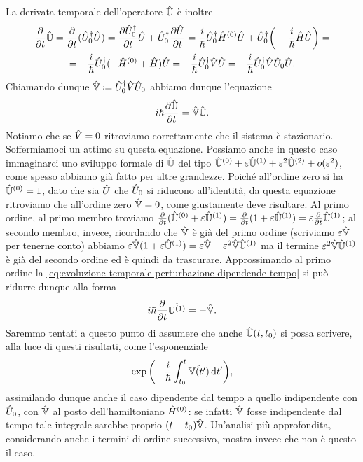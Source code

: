La derivata temporale dell'operatore $\hat{\mathbb U}$ è inoltre
\begin{multline}
	\frac{\partial {}}{\partial {t}}\hat{\mathbb U}=\frac{\partial {}}{\partial {t}}({\hat{U}_0}^\dagger\hat{U})=\frac{\partial {{\hat{U}_0}^\dagger}}{\partial {t}}\hat{U}+{\hat{U}_0}^\dagger\frac{\partial {\hat{U}}}{\partial {t}}=\frac{i}{\hbar}{\hat{U}_0}^\dagger\hat{H}^{(0)}\hat{U}+{\hat{U}_0}^\dagger\bigg(-\frac{i}{\hbar}\hat{H}\hat{U}\bigg)=\\=
	-\frac{i}{\hbar}{\hat{U}_0}^\dagger(-\hat{H}^{(0)}+\hat{H})\hat{U}=-\frac{i}{\hbar}{\hat{U}_0}^\dagger\hat{V}\hat{U}=-\frac{i}{\hbar}{\hat{U}_0}^\dagger\hat{V}\hat{U}_0\hat{U}.
\end{multline}
Chiamando dunque $\op{\mathbb V}\defeq\adj{\op U_0}\op V\op U_0$ abbiamo dunque l'equazione
\begin{equation}
	i\hbar\frac{\partial {\hat{\mathbb U}}}{\partial {t}}=\hat{\mathbb V}\hat{\mathbb U}.
	\label{eq:evoluzione-temporale-perturbazione-dipendende-tempo}
\end{equation}
Notiamo che se $\hat{V}=0$ ritroviamo correttamente che il sistema è stazionario.
Soffermiamoci un attimo su questa equazione.
Possiamo anche in questo caso immaginarci uno sviluppo formale di $\hat{\mathbb U}$ del tipo $\hat{\mathbb U}^{(0)}+\varepsilon\hat{\mathbb U}^{(1)}+\varepsilon^2\hat{\mathbb U}^{(2)}+o(\varepsilon^2)$, come spesso abbiamo già fatto per altre grandezze.
Poich\'e all'ordine zero si ha $\hat{\mathbb U}^{(0)}=1$, dato che sia $\hat{U}$ che $\hat{U}_0$ si riducono all'identità, da questa equazione ritroviamo che all'ordine zero $\hat{\mathbb V}=0$, come giustamente deve risultare.
Al primo ordine, al primo membro troviamo $\frac{\partial {}}{\partial {t}}(\hat{\mathbb U}^{(0)}+\varepsilon\hat{\mathbb U}^{(1)})=\frac{\partial {}}{\partial {t}}(1+\varepsilon\hat{\mathbb U}^{(1)})=\varepsilon\frac{\partial {}}{\partial {t}}\hat{\mathbb U}^{(1)}$; al secondo membro, invece, ricordando che $\hat{\mathbb V}$ è già del primo ordine (scriviamo $\varepsilon\hat{\mathbb V}$ per tenerne conto) abbiamo $\varepsilon\hat{\mathbb V}(1+\varepsilon\hat{\mathbb U}^{(1)})=\varepsilon\hat{\mathbb V}+\varepsilon^2\hat{\mathbb V}\hat{\mathbb U}^{(1)}$ ma il termine $\varepsilon^2\hat{\mathbb V}\hat{\mathbb U}^{(1)}$ è già del secondo ordine ed è quindi da trascurare.
Approssimando al primo ordine la \eqref{eq:evoluzione-temporale-perturbazione-dipendende-tempo} si può ridurre dunque alla forma
\begin{equation}
	i\hbar\frac{\partial {}}{\partial {t}}\hat{\mathbb U^{(1)}}=-\hat{\mathbb V}.
	\label{eq:evoluzione-temporale-perturbazione-dipendende-tempo-primo-ordine}
\end{equation}
Saremmo tentati a questo punto di assumere che anche $\hat{\mathbb U}(t,t_0)$ si possa scrivere, alla luce di questi risultati, come l'esponenziale
\begin{equation}
	\exp\bigg(\!\!-\frac{i}{\hbar}\int_{t_0}^t\hat{\mathbb V(t')}\,\textup{d} t'\bigg),
\end{equation}
assimilando dunque anche il caso dipendente dal tempo a quello indipendente con $\hat{U}_0$, con $\hat{\mathbb V}$ al posto dell'hamiltoniano $\hat{H}^{(0)}$: se infatti $\hat{\mathbb V}$ fosse indipendente dal tempo tale integrale sarebbe proprio $(t-t_0)\hat{\mathbb V}$.
Un'analisi più approfondita, considerando anche i termini di ordine successivo, mostra invece che non è questo il caso.

